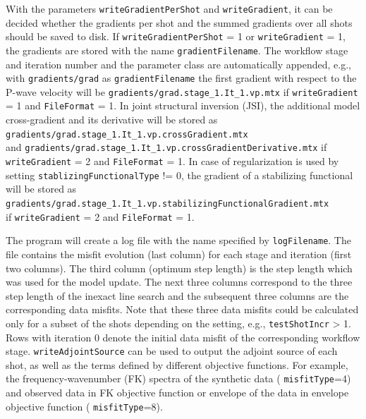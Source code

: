 \documentclass[pdftex,a4paper,parskip,listof=totoc,bibliography=totoc,onehalfspacing,12pt]{scrreprt}
\begin{document}
With the parameters \verb+writeGradientPerShot+ and \verb+writeGradient+, it can be decided whether the gradients per shot and the summed gradients over all shots should be saved to disk. If \verb+writeGradientPerShot+ = 1 or \verb+writeGradient+ = 1, the gradients are stored with the name \verb+gradientFilename+. The workflow stage and iteration number and the parameter class are automatically appended, e.g., with \verb+gradients/grad+ as \verb+gradientFilename+ the first gradient with respect to the P-wave velocity will be \verb+gradients/grad.stage_1.It_1.vp.mtx+ if \verb+writeGradient+ = 1 and \verb+FileFormat+ = 1. In joint structural inversion (JSI), the additional model cross-gradient and its derivative will be stored as \verb+gradients/grad.stage_1.It_1.vp.crossGradient.mtx+\\
and \verb+gradients/grad.stage_1.It_1.vp.crossGradientDerivative.mtx+ if \verb+writeGradient+ = 2 and \verb+FileFormat+ = 1. In case of regularization is used by setting \verb+stablizingFunctionalType+ != 0, the gradient of a stabilizing functional will be stored as\\ \verb+gradients/grad.stage_1.It_1.vp.stabilizingFunctionalGradient.mtx+\\ if \verb+writeGradient+ = 2 and \verb+FileFormat+ = 1.

The program will create a log file with the name specified by \verb+logFilename+. The file contains the misfit evolution (last column) for each stage and iteration (first two columns). The third column (optimum step length) is the step length which was used for the model update. The next three columns correspond to the three step length of the inexact line search and the subsequent three columns are the corresponding data misfits. Note that these three data misfits could be calculated only for a subset of the shots depending on the setting, e.g., \verb+testShotIncr+ > 1. Rows with iteration 0 denote the initial data misfit of the corresponding workflow stage. \verb+writeAdjointSource+ can be used to output the adjoint source of each shot, as well as the terms defined by different objective functions. For example, the frequency-wavenumber (FK) spectra of the synthetic data ( \verb+misfitType+=4) and observed data in FK objective function or envelope of the data in envelope objective function ( \verb+misfitType+=8).
\end{document}
